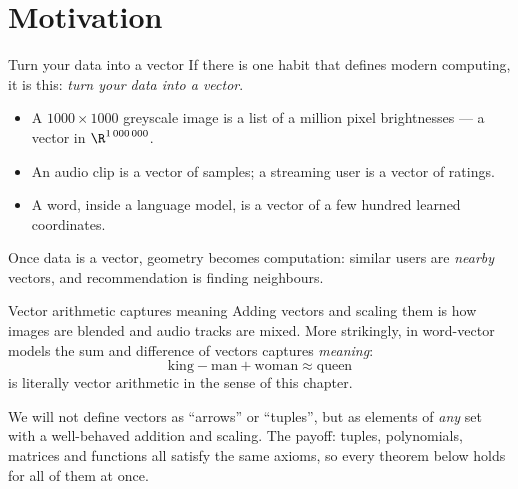 

\section{Motivation}

\begin{frame}{Turn your data into a vector}
If there is one habit that defines modern computing, it is this: \emph{turn your data into a vector}.

\begin{itemize}
\item A $1000\times 1000$ greyscale image is a list of a million pixel brightnesses — a vector in $\R^{1\,000\,000}$.
\pause
\item An audio clip is a vector of samples; a streaming user is a vector of ratings.
\pause
\item A word, inside a language model, is a vector of a few hundred learned coordinates.
\end{itemize}

\pause

\begin{remark}
Once data is a vector, geometry becomes computation: similar users are \emph{nearby} vectors, and
recommendation is finding neighbours.
\end{remark}
\end{frame}

\begin{frame}{Vector arithmetic captures meaning}
Adding vectors and scaling them is how images are blended and audio tracks are mixed. More strikingly, in
word-vector models the sum and difference of vectors captures \emph{meaning}:
\[
\text{king} - \text{man} + \text{woman} \approx \text{queen}
\]
is literally vector arithmetic in the sense of this chapter.

\pause

\begin{remark}
We will not define vectors as ``arrows'' or ``tuples'', but as elements of \emph{any} set with a
well-behaved addition and scaling. The payoff: tuples, polynomials, matrices and functions all satisfy the
same axioms, so every theorem below holds for all of them at once.
\end{remark}
\end{frame}

